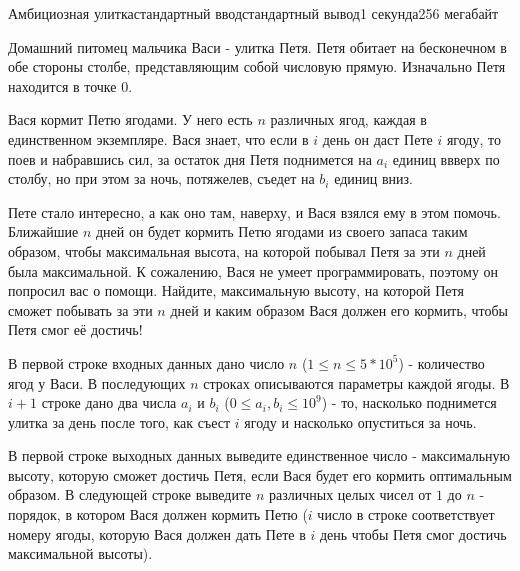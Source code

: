 \begin{problem}{Амбициозная улитка}{стандартный ввод}{стандартный вывод}{1 секунда}{256 мегабайт}

Домашний питомец мальчика Васи - улитка Петя. Петя обитает на бесконечном в обе стороны столбе, представляющим собой числовую прямую. Изначально Петя находится в точке 0.

Вася кормит Петю ягодами. У него есть $n$ различных ягод, каждая в единственном экземпляре.
Вася знает, что если в $i$ день он даст Пете $i$ ягоду, то поев и набравшись сил, за остаток дня Петя поднимется на $a_i$ единиц ввверх по столбу, но при этом за ночь, потяжелев, съедет на $b_i$ единиц вниз.

Пете стало интересно, а как оно там, наверху, и Вася взялся ему в этом помочь. Ближайшие $n$ дней он будет кормить Петю ягодами из своего запаса таким образом, чтобы максимальная высота, на которой побывал Петя за эти $n$ дней была максимальной. К сожалению, Вася не умеет программировать, поэтому он попросил вас о помощи. Найдите, максимальную высоту, на которой Петя сможет побывать за эти $n$ дней и каким образом Вася должен его кормить, чтобы Петя смог её достичь!

\InputFile
В первой строке входных данных дано число $n$ ($1 \le n \le 5 * 10 ^ 5$)  - количество ягод у Васи.
В последующих $n$ строках описываются параметры каждой ягоды. 
В $i + 1$ строке дано два числа $a_i$ и $b_i$  ($0 \le a_i, b_i \le 10 ^ 9$) - то, насколько поднимется улитка за день после того, как съест $i$ ягоду и насколько опуститься за ночь.

\OutputFile
В первой строке выходных данных выведите единственное число - максимальную высоту, которую сможет достичь Петя, если Вася будет его кормить оптимальным образом.
В следующей строке выведите $n$ различных целых чисел от $1$ до $n$ - порядок, в котором Вася должен кормить Петю ($i$ число в строке соответствует номеру ягоды, которую Вася должен дать Пете в $i$ день чтобы Петя смог достичь максимальной высоты).

\Example

\begin{example}
%
\end{example}

\end{problem}

